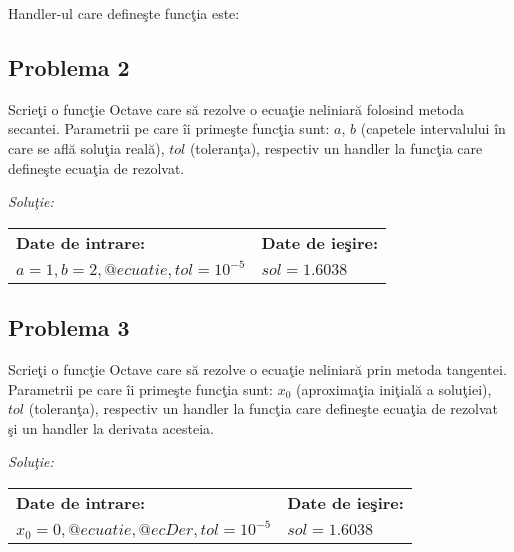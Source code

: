 \documentclass{exam}
\newcommand{\octavescript}[2]{
	
}
\begin{document}
Handler-ul care defineşte funcţia este:

\octavescript{./src/ecuatie.m}{Handler funcţie.}


\subsection{Problema 2}
Scrieţi o funcţie Octave care să rezolve o ecuaţie neliniară folosind metoda secantei. Parametrii pe care îi primeşte funcţia sunt: $a$, $b$ (capetele intervalului în care se află soluţia reală), $tol$ (toleranţa), respectiv un handler la funcţia care defineşte ecuaţia de rezolvat.

\textit{Soluţie:}

\octavescript{./src/secanta.m}{Regula secantei.}

\begin{center}
	\begin{tabular}{| l | l |}
		\hline
		\textbf{Date de intrare:}                 & \textbf{Date de ieşire:} \\
		$a = 1, b = 2, @ecuatie, tol = 10 ^ {-5}$ & $sol = 1.6038$           \\
		\hline
	\end{tabular}
\end{center}


\subsection{Problema 3}
Scrieţi o funcţie Octave care să rezolve o ecuaţie neliniară  prin metoda tangentei. Parametrii pe care îi primeşte funcţia sunt: $x_0$ (aproximaţia iniţială a soluţiei), $tol$ (toleranţa), respectiv un handler la funcţia care defineşte ecuaţia de rezolvat şi un handler la derivata acesteia.

\textit{Soluţie:}

\octavescript{./src/tangenta.m}{Metoda tangentei.}

\begin{center}
	\begin{tabular}{| l | l |}
		\hline
		\textbf{Date de intrare:}                    & \textbf{Date de ieşire:} \\
		$x_0 = 0, @ecuatie, @ecDer, tol = 10 ^ {-5}$ & $sol = 1.6038$           \\
		\hline
	\end{tabular}
\end{center}
\end{document}
